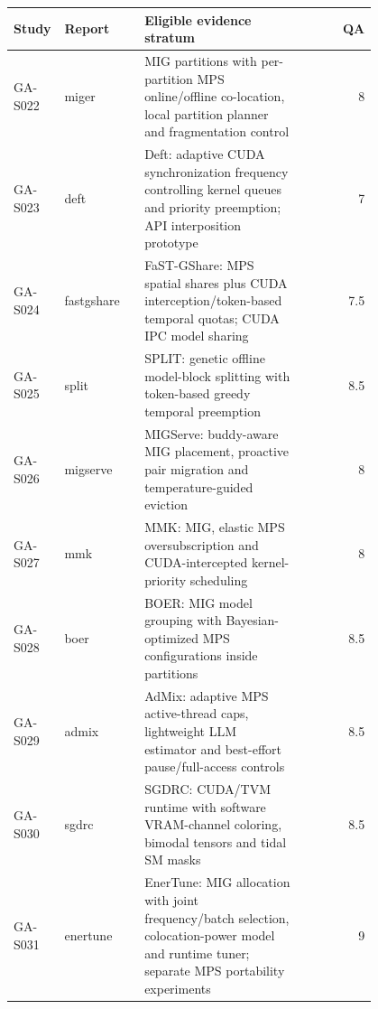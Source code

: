 \begin{longtable}{P{0.14\linewidth}P{0.22\linewidth}P{0.44\linewidth}r}

\toprule Study & Report & Eligible evidence stratum & QA\\\midrule\endhead

GA-S022 & miger \cite{miger} & MIG partitions with per-partition MPS online/offline co-location, local partition planner and fragmentation control & 8\\

GA-S023 & deft \cite{deft} & Deft: adaptive CUDA synchronization frequency controlling kernel queues and priority preemption; API interposition prototype & 7\\

GA-S024 & fastgshare \cite{fastgshare} & FaST-GShare: MPS spatial shares plus CUDA interception/token-based temporal quotas; CUDA IPC model sharing & 7.5\\

GA-S025 & split \cite{split} & SPLIT: genetic offline model-block splitting with token-based greedy temporal preemption & 8.5\\

GA-S026 & migserve \cite{migserve} & MIGServe: buddy-aware MIG placement, proactive pair migration and temperature-guided eviction & 8\\

GA-S027 & mmk \cite{mmk} & MMK: MIG, elastic MPS oversubscription and CUDA-intercepted kernel-priority scheduling & 8\\

GA-S028 & boer \cite{boer} & BOER: MIG model grouping with Bayesian-optimized MPS configurations inside partitions & 8.5\\

GA-S029 & admix \cite{admix} & AdMix: adaptive MPS active-thread caps, lightweight LLM estimator and best-effort pause/full-access controls & 8.5\\

GA-S030 & sgdrc \cite{sgdrc} & SGDRC: CUDA/TVM runtime with software VRAM-channel coloring, bimodal tensors and tidal SM masks & 8.5\\

GA-S031 & enertune \cite{enertune} & EnerTune: MIG allocation with joint frequency/batch selection, colocation-power model and runtime tuner; separate MPS portability experiments & 9\\

\bottomrule\end{longtable}

